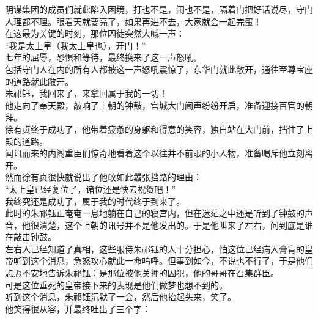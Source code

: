 \begin{multicols}{\theparacolNo}
阴谋集团的成员们就此陷入困境，打也不是，闹也不是，隔着门把好话说尽，守门人理都不理。眼看天就要亮了，如果再进不去，大家就会一起完蛋！\\

在这最为关键的时刻，那位囚徒突然大喊一声：\\

“我是太上皇（我太上皇也），开门！”\\

七年的屈辱，恐惧和等待，最终换来了这一声怒吼。\\

包括守门人在内的所有人都被这一声怒吼震惊了，东华门就此敞开，通往至尊宝座的道路就此敞开。\\

朱祁钰，我回来了，来拿回属于我的一切！\\

他走向了奉天殿，敲响了上朝的钟鼓，宫城大门闻声纷纷开启，准备迎接百官的朝拜。\\

徐有贞终于成功了，他带着疲惫的身躯和得意的笑容，独自站在大门前，挡住了上殿的道路。\\

闻讯而来的内阁重臣们惊奇地看着这个以往并不前眼的小人物，准备喝斥他立刻离开。\\

然而徐有贞很快就说出了他敢如此嚣张挡路的理由：\\

“太上皇已经复位了，诸位还是快去祝贺吧！”\\

我终究还是成功了，属于我的时代终于到来了。\\

此时的朱祁钰正奄奄一息地躺在自己的寝宫内，但在迷茫之中还是听到了钟鼓的声音，他很清楚，这个上朝的讯号并不是他发出的。于是他叫来了左右，问到底是谁在敲击钟鼓。\\

左右人已经知道了真相，这些服侍朱祁钰的人十分担心，怕这位已经病入膏肓的皇帝听到这个消息，急怒攻心就此一命呜呼。但事到如今，不说也不行了，于是他们忐忑不安地告诉朱祁钰：是那位被他关押的囚犯，他的哥哥在召集群臣。\\

可是这位垂死的皇帝接下来的表现是他们做梦也想不到的。\\

听到这个消息，朱祁钰沉默了一会，然后他抬起头来，笑了。\\

他笑得很从容，并最终吐出了三个字：\\


\end{multicols}
